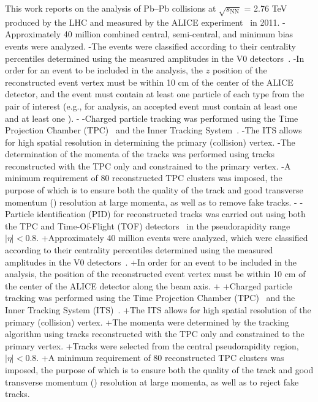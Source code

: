 { This work reports on the analysis of Pb--Pb collisions at $\sqrt{s_{\mathrm{NN}}}$ = 2.76 TeV produced by the LHC and measured by the ALICE experiment~\cite{Aamodt:2008zz} in 2011.
-Approximately 40 million combined central, semi-central, and minimum bias events were analyzed.
-The events were classified according to their centrality percentiles determined using the measured amplitudes in the V0 detectors~\cite{Abelev:2013qoq}.  
-In order for an event to be included in the analysis, the $z$ position of the reconstructed event vertex must be within 10 cm of the center of the ALICE detector, and the event must contain at least one particle of each type from the pair of interest (e.g., for \LamKs analysis, an accepted event must contain at least one \Lam and at least one \Ks). 
-
-Charged particle tracking was performed using the Time Projection Chamber (TPC)~\cite{2010NIMPA.622..316A} and the Inner Tracking System~\cite{Abelevetal:2014dna}.  
-The ITS allows for high spatial resolution in determining the primary (collision) vertex.
-The determination of the momenta of the tracks was performed using tracks reconstructed with the TPC only and constrained to the primary vertex.
-A minimum requirement of 80 reconstructed TPC clusters was imposed, the purpose of which is to ensure both the quality of the track and good transverse momentum (\pt) resolution at large momenta, as well as to remove fake tracks.
-
-Particle identification (PID) for reconstructed tracks was carried out using both the TPC and Time-Of-Flight (TOF) detectors~\cite{Abelev:2014ffa, Akindinov:2013tea} in the pseudorapidity range $|\eta| < 0.8$.  
+Approximately 40 million events were analyzed, which were classified according to their centrality percentiles determined using the measured amplitudes in the V0 detectors~\cite{Abelev:2013qoq}.  
+In order for an event to be included in the analysis, the position of the reconstructed event vertex must be within 10 cm of the center of the ALICE detector along the beam axis. 
+
+Charged particle tracking was performed using the Time Projection Chamber (TPC)~\cite{2010NIMPA.622..316A} and the Inner Tracking System (ITS)~\cite{Abelevetal:2014dna}.  
+The ITS allows for high spatial resolution of the primary (collision) vertex.
+The momenta were determined by the tracking algorithm using tracks reconstructed with the TPC only and constrained to the primary vertex.
+Tracks were selected from the central pseudorapidity region, $|\eta| < 0.8$.
+A minimum requirement of 80 reconstructed TPC clusters was imposed, the purpose of which is to ensure both the quality of the track and good transverse momentum (\pt) resolution at large momenta, as well as to reject fake tracks.
}
